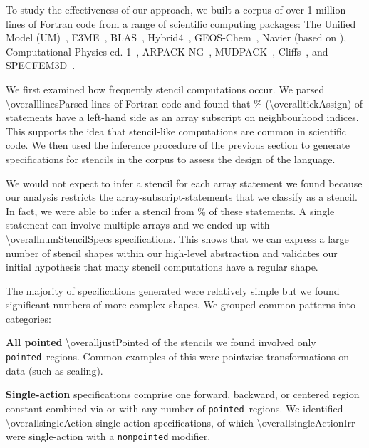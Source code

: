 

\newcommand\regname[1]{\texttt{#1}}
\newcommand\pointed{\regname{pointed}}
\newcommand\forward{\regname{forward}}

To study the effectiveness of our approach,
we built a corpus of over 1 million lines of Fortran code from a
range of scientific computing packages: The Unified Model (UM)~\cite{um},
E3ME~\cite{RePEc:aen:journl:2006se-a12}, BLAS~\cite{blas},
Hybrid4~\cite{GBC:GBC635}, GEOS-Chem~\cite{geos-chem}, Navier (based
on \cite{griebel1997numerical}), Computational Physics
ed. 1~\cite{giordano1997computational},
ARPACK-NG~\cite{arpackng}, MUDPACK~\cite{MUD}, Cliffs~\cite{Cliffs}, and
SPECFEM3D~\cite{specfem3d}.

We first examined how frequently stencil computations occur. We parsed
\num{\overalllinesParsed} lines of Fortran code and found that \overalltickAssignPercent\%
(\num{\overalltickAssign}) of statements have a left-hand side as an
array subscript on neighbourhood indices. This supports the idea that
stencil-like computations are common in scientific code.  We then used
the inference procedure of the previous section to generate
specifications for stencils in the corpus to assess the design of the
language.

We would not expect to infer a stencil for each array statement we
found because our analysis restricts the array-subscript-statements
that we classify as a stencil. In fact, we were able to infer a
stencil from \overalltickAssignSuccessPercentOfTickAssign\% of these
statements. A single statement can involve multiple arrays and we
ended up with \num{\overallnumStencilSpecs} specifications. This shows
that we can express a large number of stencil shapes within our
high-level abstraction and validates our initial hypothesis that many
stencil computations have a regular shape.

The majority of specifications generated were relatively simple but we
found significant numbers of more complex shapes. We grouped common
patterns into categories:

\textbf{All pointed} \num{\overalljustPointed} of the stencils we
found involved only \pointed\ regions.
Common examples of this were pointwise transformations on data (such
as scaling).

\textbf{Single-action} specifications comprise one
forward, backward, or centered region constant combined via \term{+}
or \term{*} with any number of \pointed\ regions. We identified \num{\overallsingleAction} single-action
specifications, of which \num{\overallsingleActionIrr} were single-action with a
\texttt{nonpointed} modifier.

